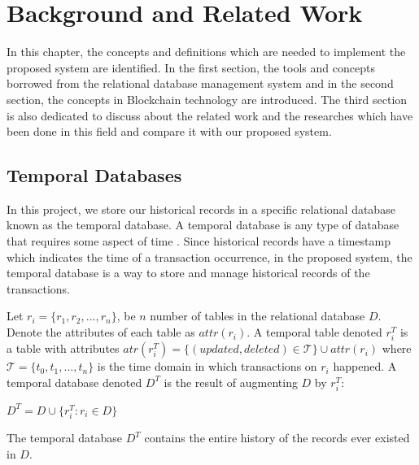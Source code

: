 \chapter{Background and Related Work} \label{ch:background}
	In this chapter, the concepts and definitions which are needed to implement the proposed system are identified. In the first section, the tools and concepts borrowed from the relational database management system and in the second section, the concepts in Blockchain technology are introduced. The third section is also dedicated to discuss about the related work and the researches which have been done in this field and compare it with our proposed system.

	\section{Temporal Databases} \label{sec:temporal database}
		In this project, we store our historical records in a specific relational database known as the temporal database. A temporal database is any type of database that requires some aspect of time \cite {elmasri2010fundamentalsofdatabase}. Since historical records have a timestamp which indicates the time of a transaction occurrence, in the proposed system, the temporal database is a way to store and manage historical records of the transactions.
		\begin{defn}
			Let $ r_i = \{r_1, r_2, ... , r_n \}$, be $n$ number of tables in the relational database $D$. Denote the attributes of each table as $attr(r_i)$. A temporal table denoted $r_i^T$ is a table with attributes $atr(r_i^T) = \{ (updated, deleted) \in \mathcal{T} \}\cup attr(r_i)$ where $\mathcal{T} = \{t_0,t_1,...,t_n\}$ is the time domain in which transactions on $r_i$ happened. A temporal database denoted $D^T$ is the result of augmenting $D$ by $r_i^T$:

			\begin{center}
				{$D^T = D \cup \{{r_i^T}: r_i \in D \}$}
			\end{center}
		\label{dfn:temporal_database}
		\end {defn}

		The temporal database $D^T$ contains the entire history of the records ever existed in $D$.

